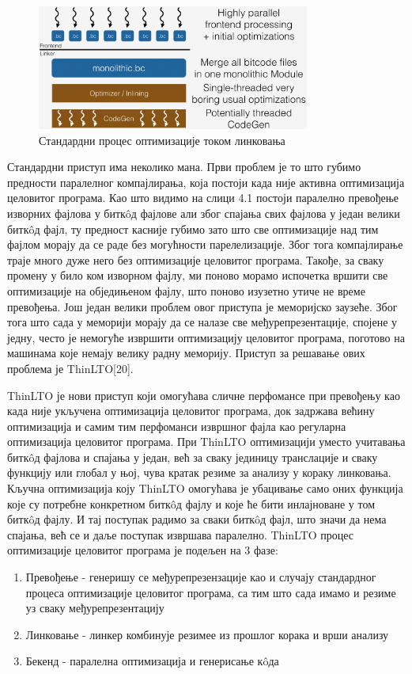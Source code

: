 \documentclass[12pt,oneside]{memoir}
\begin{document}
\begin{figure}[!ht]
  \centering
  \includegraphics[width=0.8\textwidth]{LTO_normal.png}
  \caption{Стандардни процес оптимизације током линковања}
  \label{fig:grafikon}
\end{figure}

Стандардни приступ има неколико мана.
Први проблем је то што губимо предности паралелног компајлирања, која постоји 
када није активна оптимизација целовитог програма.
Као што видимо на слици 4.1 постоји паралелно превођење изворних фајлова у 
битк\^{o}д фајлове али због спајања свих фајлова у један велики битк\^{o}д фајл,
ту предност касније губимо зато што све оптимизације над тим фајлом морају 
да се раде без могућности парелелизације.
Због тога компајлирање траје много дуже него без оптимизације целовитог програма.
Такође, за сваку промену у било ком изворном фајлу, ми поново морамо испочетка
вршити све оптимизације на обједињеном фајлу, што поново изузетно утиче не време
превођења.
Још један велики проблем овог приступа је меморијско заузеће.
Због тога што сада у меморији морају да се налазе све међурепрезентације, спојене
у једну, често је немогуће извршити оптимизацију целовитог програма, поготово на 
машинама које немају велику радну меморију.
Приступ за решавање ових проблема је  ThinLTO[20].
\par ThinLTO је нови приступ који омогућава сличне перфомансе при превођењу
као када није укључена оптимизација целовитог програма, док задржава већину
оптимизација и самим тим перфоманси извршног фајла као регуларна оптимизација
целовитог програма.
При ThinLTO оптимизацији уместо учитавања битк\^{o}д фајлова и спајања у један,
већ за сваку јединицу транслације и сваку функцију или глобал у њој, чува кратак
резиме за анализу у кораку линковања. 
Кључна оптимизација коју ThinLTO омогућава је убацивање само оних функција које
су потребне конкретном битк\^{o}д фајлу и које ће бити инлајноване у том  битк\^{o}д фајлу.
И тај поступак радимо за сваки  битк\^{o}д фајл, што значи да нема спајања, већ се и
даље поступак  извршава паралелно.
ThinLTO процес оптимизације целовитог програма је подељен на 3 фазе:
\begin{enumerate}
\item Превођење - генеришу се међурепрезензације као и случају стандардног процеса
	оптимизације целовитог програма, са тим што сада имамо и резиме уз сваку
	међурепрезентацију
\item Линковање - линкер комбинује резимее из прошлог корака и врши анализу
\item Бекенд - паралелна оптимизација и генерисање к\^{o}да
\end{enumerate}
 
\end{document}
